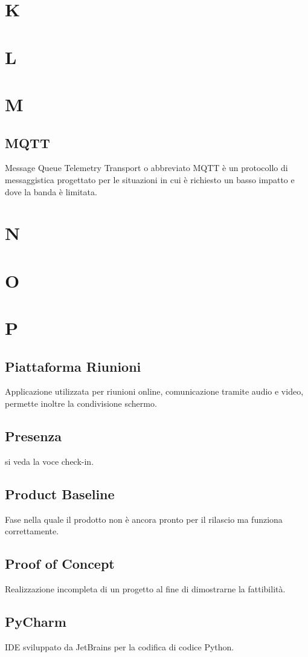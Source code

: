 \section{K}
\section{L}
\section{M}
\subsection{MQTT}
Message Queue Telemetry Transport o abbreviato MQTT è un protocollo di messaggistica progettato per le situazioni in cui è richiesto
un basso impatto e dove la banda è limitata.
\newpage
\section{N}
\section{O}
\section{P}
\subsection{Piattaforma Riunioni}
Applicazione utilizzata per riunioni online, comunicazione tramite audio e video, permette inoltre la condivisione schermo.
\subsection{Presenza}
si veda la voce check-in.
\newpage
\subsection{Product Baseline}
Fase nella quale il prodotto non è ancora pronto per il rilascio ma funziona correttamente.
\subsection{Proof of Concept}
Realizzazione incompleta di un progetto al fine di dimostrarne la fattibilità.
\subsection{PyCharm}
IDE sviluppato da JetBrains per la codifica di codice Python.
